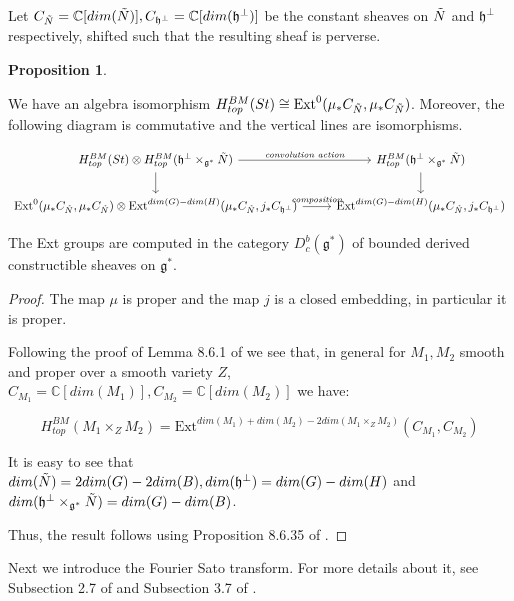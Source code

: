\documentclass[12pt]{article}
\newcommand{\C}{\mathbb{C}}
\theoremstyle{plain}
\theoremstyle{definition}
\newtheorem{prop}[theorem]{Proposition}
\begin{document}
Let $C_{\Tilde{N}}=\C[dim(\Tilde{N})],C_{\mathfrak{h}^\perp}=\C[dim(\mathfrak{h}^\perp)]$ be the constant sheaves on $\Tilde{N}$ and $\mathfrak{h}^\perp$ respectively, shifted such that the resulting sheaf is perverse.

\begin{prop}\label{pass to Ext}

 We have an algebra isomorphism $H^{BM}_{top}(St)\cong \text{Ext}^{0}(\mu_*C_{\Tilde{N}}, \mu_*C_{\Tilde{N}})$. Moreover, the following diagram is commutative and the vertical lines are isomorphisms. 

    \[
    \begin{tikzcd}
H^{BM}_{top}(St) \otimes H^{BM}_{top}(\mathfrak{h}^\perp\times_{\mathfrak{g}^*}\Tilde{N}) 
    \arrow[r, "\textit{convolution action}"] 
    \arrow[d]
& H^{BM}_{top}(\mathfrak{h}^\perp\times_{\mathfrak{g}^*}\Tilde{N}) 
    \arrow[d] \\
\text{Ext}^{0}(\mu_*C_{\Tilde{N}}, \mu_*C_{\Tilde{N}}) \otimes \text{Ext}^{dim(G)-dim(H)}(\mu_*C_{\Tilde{N}}, j_*C_{\mathfrak{h}^\perp}) 
    \arrow[r, "\textit{composition}"] 
& \text{Ext}^{dim(G)-dim(H)}(\mu_*C_{\Tilde{N}}, j_*C_{\mathfrak{h}^\perp})
\end{tikzcd}
\]

The Ext groups are computed in the category ${D_c^b(\mathfrak{g}^{*})}$ of bounded derived constructible sheaves on $\mathfrak{g}^{*}$.

\end{prop}

\begin{proof}
    The map $\mu$ is proper and the map $j$ is a closed embedding, in particular it is proper. 

    Following the proof of Lemma 8.6.1 of \cite{Chriss1997RepresentationTA} we see that, in general for $M_1,M_2$ smooth and proper over a smooth variety $Z$, $C_{M_1}=\C[dim(M_1)],C_{M_2}=\C[dim(M_2)]$ we have:
    
    $$H_{top}^{BM}(M_1\times_Z M_2)=\text{Ext}^{dim(M_1)+dim(M_2)-2dim(M_1\times_Z M_2)}(C_{M_1},C_{M_2})$$

    It is easy to see that $dim(\Tilde{N})=2dim(G)-2dim(B),dim(\mathfrak{h}^\perp)=dim(G)-dim(H)$ and $dim(\mathfrak{h}^\perp\times_{\mathfrak{g}^*}\Tilde{N})=dim(G)-dim(B)$.

    Thus, the result follows using Proposition 8.6.35 of \cite{Chriss1997RepresentationTA}. 
\end{proof}

Next we introduce the Fourier Sato transform. For more details about it, see Subsection 2.7 of \cite{Achar_2013} and Subsection 3.7 of \cite{KashiwaraSchapira1990}.
\end{document}
